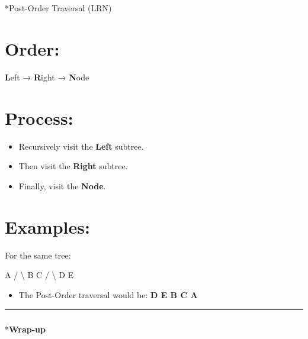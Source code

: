 \documentclass[
  letterpaper,
  DIV=11,
  numbers=noendperiod]{scrreprt}
\makeatletter
\let\oldsubparagraph\subparagraph
\renewcommand{\subparagraph}{
    \@ifstar
      \xxxSubParagraphStar
      \xxxSubParagraphNoStar
  }
\newcommand{\xxxSubParagraphStar}[1]{\oldsubparagraph*{#1}\mbox{}}
\newcommand{\xxxSubParagraphNoStar}[1]{\oldsubparagraph{#1}\mbox{}}
\newenvironment{Shaded}{\begin{snugshade}}{\end{snugshade}}
\newcommand{\NormalTok}[1]{\textcolor[rgb]{0.00,0.23,0.31}{#1}}
\providecommand{\tightlist}{%
  \setlength{\itemsep}{0pt}\setlength{\parskip}{0pt}}
\makeatother
\begin{document}
\subparagraph*{Post-Order Traversal
(LRN)}\label{post-order-traversal-lrn}

\section{Order:}

\textbf{L}eft → \textbf{R}ight → \textbf{N}ode

\section{Process:}

\begin{itemize}
\tightlist
\item
  Recursively visit the \textbf{Left} subtree.
\item
  Then visit the \textbf{Right} subtree.
\item
  Finally, visit the \textbf{Node}.
\end{itemize}

\section{Examples:}

For the same tree:

\begin{Shaded}
\begin{Highlighting}[]
\NormalTok{    A}
\NormalTok{   / \textbackslash{}}
\NormalTok{  B   C}
\NormalTok{ / \textbackslash{}}
\NormalTok{D   E}
\end{Highlighting}
\end{Shaded}

\begin{itemize}
\tightlist
\item
  The Post-Order traversal would be: \textbf{D E B C A}
\end{itemize}

\begin{center}\rule{0.5\linewidth}{0.5pt}\end{center}

\subparagraph*{\texorpdfstring{\textbf{Wrap-up}}{Wrap-up}}\label{wrap-up-1}
\end{document}
